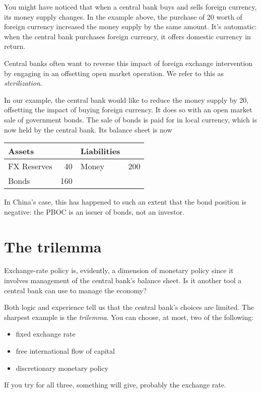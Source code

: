 You might have noticed that when a central bank buys and sells foreign currency,
its money supply changes.
In the example above, the purchase of 20 worth of foreign currency increased the money supply by the same amount.
It's automatic:  when the central bank purchases foreign currency, it offers domestic
currency in return.

Central banks often want to reverse this impact of foreign exchange intervention
by engaging in an offsetting open market operation.
We refer to this as {\it sterilization\/}.

In our example, the central bank would like to reduce the money supply by 20,
offsetting the impact of buying foreign currency.
It does so with an open market sale of government bonds.
The sale of bonds is paid for in local currency, which is now held
by the central bank.
Its balance sheet is now
%
\begin{center}
\begin{tabular}{lr|lr}
               Assets  &     &     Liabilities                     \\
               \hline
               FX Reserves &  40 &     Money &  200   \\
               Bonds  & 160 &
\end{tabular}
\end{center}
%
In China's case, this has happened to such an extent that the bond
position is negative:  the PBOC is an issuer of bonds, not an investor.


\section{The trilemma}

Exchange-rate policy is, evidently, a dimension of monetary policy
since it involves management of the central bank's balance sheet.
Is it another tool a central bank can use to manage the economy?

Both logic and experience tell us that the central bank's choices are limited.
The sharpest example is the {\it trilemma\/}.
You can choose, at most, two of the following:
\begin{itemize}
\item fixed exchange rate
\item free international flow of capital
\item discretionary monetary policy
\end{itemize}
If you try for all three, something will give, probably the exchange rate.

